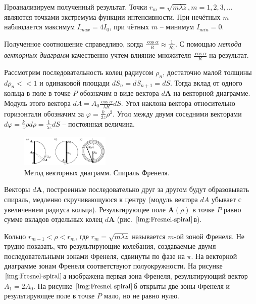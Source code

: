 Проанализируем полученный результат. Точки $r_m = \sqrt{m \lambda z}, m = 1, 2, 3, \dots$ являются точками экстремума функции интенсивности. При нечётных $m$ наблюдается максимум $I_{max} = 4I_0$, при чётных $m$ -- минимум $I_{min} = 0$.

Полученное соотношение справедливо, когда $\frac{\cos \alpha}{R} \approx \frac{1}{R_0}$. С помощью \textit{метода векторных диаграмм} качественно учтем влияние множителя $\frac{\cos \alpha}{R}$ на результат.

Рассмотрим последовательность колец радиусом $\rho_n$, достаточно малой толщины $d \rho_n << 1$ и одинаковой площади $dS_n = dS_{n+1} = dS$. Тогда вклад от одного кольца в поле в точке $P$ обозначим в виде вектора $d \boldsymbol{A}$ на векторной диаграмме. Модуль этого вектора $dA = A_0 \frac{\cos \alpha}{\lambda R} dS$. Угол наклона вектора относительно горизонтали обозначим за $\varphi = \frac{k}{2z} \rho^2$. Угол между двумя соседними векторами $d \varphi = \frac{k}{z} \rho d \rho = \frac{1}{\lambda z} dS$ -- постоянная величина. 

\begin{figure}
	\centering
	\includegraphics[width=0.38\textwidth]{../Изображения/Векторные диаграммы.png}
	\caption{Метод векторных диаграмм. Спираль Френеля.}
	\label{img:Fresnel-spiral}
\end{figure}

Векторы $d \boldsymbol{A}$, построенные последовательно друг за другом будут образовывать спираль, медленно скручивающуюся к центру (модуль вектора $dA$ убывает с увеличением радиуса кольца). Результирующее поле $\boldsymbol{A}(\rho)$ в точке $P$ равно сумме вкладов отдельных колец $d\boldsymbol{A}$ (рис. $\ref{img:Fresnel-spiral}$в).

Кольцо $r_{m - 1} < \rho < r_{m}$, где $r_m = \sqrt{m \lambda z}$ называется $m$-ой зоной Френеля. Не трудно показать, что результирующие колебания, создаваемые двумя последовательными зонами Френеля, сдвинуты по фазе на $\pi$. На векторной диаграмме зонам Френеля соответствуют полуокружности. На рисунке $\ref{img:Fresnel-spiral}$а изображена первая зона Френеля, результирующий вектор $A_1 = 2 A_0$. На рисунке $\ref{img:Fresnel-spiral}$б открыты две зоны Френеля и результирующее поле в точке $P$ мало, но не равно нулю.

